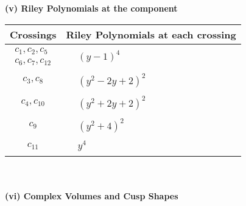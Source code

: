 \documentclass[1p]{elsarticle_modified}
\theoremstyle{definition}
\begin{document}
\newpage\renewcommand{\arraystretch}{1}
\flushleft \textbf{(v) Riley Polynomials at the component}\newline \\
\begin{tabular}{m{50pt}|m{274pt}}
Crossings & \hspace{64pt}Riley Polynomials at each crossing \\
\hline $$\begin{aligned}c_{1},c_{2},c_{5}\\c_{6},c_{7},c_{12}\end{aligned}$$&$\begin{aligned}
&(y-1)^4
\end{aligned}$\\
\hline $$\begin{aligned}c_{3},c_{8}\end{aligned}$$&$\begin{aligned}
&(y^2-2 y+2)^2
\end{aligned}$\\
\hline $$\begin{aligned}c_{4},c_{10}\end{aligned}$$&$\begin{aligned}
&(y^2+2 y+2)^2
\end{aligned}$\\
\hline $$\begin{aligned}c_{9}\end{aligned}$$&$\begin{aligned}
&(y^2+4)^2
\end{aligned}$\\
\hline $$\begin{aligned}c_{11}\end{aligned}$$&$\begin{aligned}
&y^4
\end{aligned}$\\
\hline
\end{tabular}\\~\\
\newpage\flushleft \textbf{(vi) Complex Volumes and Cusp Shapes}
\end{document}
